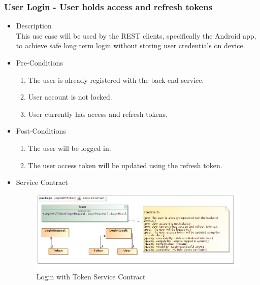 \documentclass[a4paper,10pt]{article}
\begin{document}
\subsubsection{User Login - User holds access and refresh tokens}
	\begin{itemize}
		\item Description\\
		This use case will be used by the REST clients, specifically the Android app, to achieve safe long term login without storing user credentials on device. 
		\item Pre-Conditions
			\begin{enumerate}
				\item The user is already registered with the back-end service.
				\item User account is not locked.
				\item User currently has access and refresh tokens.
			\end{enumerate}
		\item Post-Conditions
			\begin{enumerate}
				\item The user will be logged in.
				\item The user access token will be updated using the refresh token.
			\end{enumerate}
		\item Service Contract
			\begin{figure}[H]
				\includegraphics[scale=0.5]{loginWithToken}
				\caption{Login with Token Service Contract}
			\end{figure}
	\end{itemize}
\end{document}
